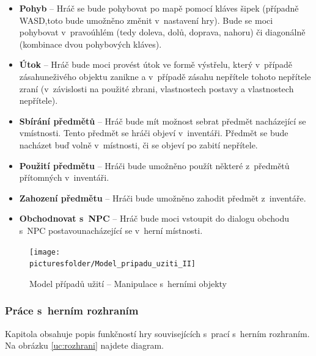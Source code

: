 \documentclass[12pt,a4paper]{article}
\def\picturesfolder{obrazky}
\begin{document}
\begin {itemize}
\item{\textbf{Pohyb} --  Hráč se bude pohybovat po mapě pomocí kláves šipek
  (případně WASD,toto bude umožněno změnit v~nastavení hry). Bude se moci
  pohybovat v~pravoúhlém (tedy doleva, dolů, doprava, nahoru) či diagonálně
  (kombinace dvou pohybových kláves).}
\item{\textbf{Útok} --  Hráč bude moci provést útok ve formě výstřelu, který
v~případě zásahuneživého objektu zanikne a v~případě zásahu nepřítele tohoto
  nepřítele zraní (v~závislosti na použité zbrani, vlastnostech postavy a
  vlastnostech nepřítele).}
\item{\textbf{Sbírání předmětů} --  Hráč bude mít možnost sebrat předmět
  nacházející se vmístnosti. Tento předmět se hráči objeví v~inventáři. Předmět
  se bude nacházet buď volně v~místnosti, či se objeví po zabití nepřítele.}
\item{\textbf{Použití předmětu} --  Hráči bude umožněno použít některé
z~předmětů přítomných v~inventáři.}
\item{\textbf{Zahození předmětu} --  Hráči bude umožněno zahodit předmět
z~inventáře.}
\item{\textbf{Obchodnovat s~NPC} --  Hráč bude moci vstoupit do dialogu obchodu
  s~NPC postavounacházející se v~herní místnosti.}
\end {itemize}

\begin{figure}
\begin{center}
  \texttt{[image: \\picturesfolder/Model\_pripadu\_uziti\_II]}
  \caption{Model případů užití -- Manipulace s~herními objekty}
  \label{uc:manipulace}
\end{center}
\end{figure}

\subsubsection{Práce s~herním rozhraním}

Kapitola obsahuje popis funkčností hry souvisejících s~prací s~herním rozhraním.
Na obrázku \ref{uc:rozhrani} najdete diagram.
\end{document}
